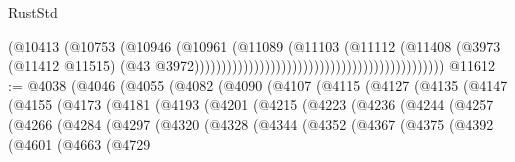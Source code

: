\begin{lexlean}{RustStd}
\begin{coremodule}
                                                                            (@10413
                                                                              (@10753
                                                                                (@10946
                                                                                  (@10961
                                                                                    (@11089
                                                                                      (@11103
                                                                                        (@11112
                                                                                          (@11408
                                                                                            (@3973
                                                                                              (@11412
                                                                                                @11515)
                                                                                              (@43
                                                                                                @3972))))))))))))))))))))))))))))))))))))))))))))))
@11612 := @4038
    (@4046
      (@4055
        (@4082
          (@4090
            (@4107
              (@4115
                (@4127
                  (@4135
                    (@4147
                      (@4155
                        (@4173
                          (@4181
                            (@4193
                              (@4201
                                (@4215
                                  (@4223
                                    (@4236
                                      (@4244
                                        (@4257
                                          (@4266
                                            (@4284
                                              (@4297
                                                (@4320
                                                  (@4328
                                                    (@4344
                                                      (@4352
                                                        (@4367
                                                          (@4375
                                                            (@4392
                                                              (@4601
                                                                (@4663
                                                                  (@4729

\end{coremodule}
\end{lexlean}
